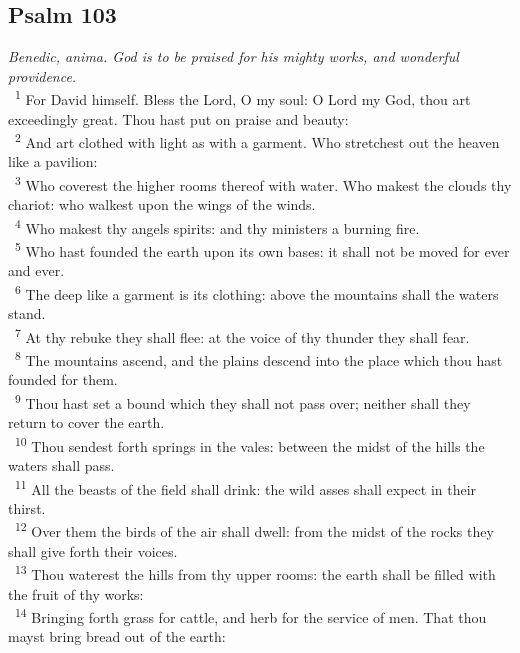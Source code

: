 \documentclass[a5paper,12pt]{article}
\begin{document}
\begin{multicols*}{2}
\section{Psalm 103}
\label{sec:org10177e5}
\emph{Benedic, anima. God is to be praised for his mighty works, and wonderful providence.}\\

~\textsuperscript{1} For David himself. Bless the Lord, O my soul: O Lord my God, thou art exceedingly great. Thou hast put on praise and beauty:\\
~\textsuperscript{2} And art clothed with light as with a garment. Who stretchest out the heaven like a pavilion:\\
~\textsuperscript{3} Who coverest the higher rooms thereof with water. Who makest the clouds thy chariot: who walkest upon the wings of the winds.\\
~\textsuperscript{4} Who makest thy angels spirits: and thy ministers a burning fire.\\
~\textsuperscript{5} Who hast founded the earth upon its own bases: it shall not be moved for ever and ever.\\
~\textsuperscript{6} The deep like a garment is its clothing: above the mountains shall the waters stand.\\
~\textsuperscript{7} At thy rebuke they shall flee: at the voice of thy thunder they shall fear.\\
~\textsuperscript{8} The mountains ascend, and the plains descend into the place which thou hast founded for them.\\
~\textsuperscript{9} Thou hast set a bound which they shall not pass over; neither shall they return to cover the earth.\\
~\textsuperscript{10} Thou sendest forth springs in the vales: between the midst of the hills the waters shall pass.\\
~\textsuperscript{11} All the beasts of the field shall drink: the wild asses shall expect in their thirst.\\
~\textsuperscript{12} Over them the birds of the air shall dwell: from the midst of the rocks they shall give forth their voices.\\
~\textsuperscript{13} Thou waterest the hills from thy upper rooms: the earth shall be filled with the fruit of thy works:\\
~\textsuperscript{14} Bringing forth grass for cattle, and herb for the service of men. That thou mayst bring bread out of the earth:\\

\end{multicols*}
\end{document}
